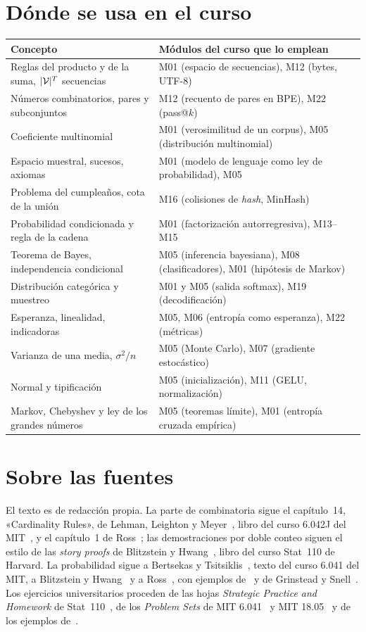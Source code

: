 \documentclass[11pt,a4paper,twoside,openany]{book}
\begin{document}
\section*{Dónde se usa en el curso}
\begin{center}\small
\begin{tabular}{@{}p{}p{}@{}}
\toprule
Concepto & Módulos del curso que lo emplean \\
\midrule
Reglas del producto y de la suma, $\lvert\mathcal{V}\rvert^{T}$ secuencias & M01 (espacio de secuencias), M12 (bytes, UTF-8) \\
Números combinatorios, pares y subconjuntos & M12 (recuento de pares en BPE), M22 (pass@$k$) \\
Coeficiente multinomial & M01 (verosimilitud de un corpus), M05 (distribución multinomial) \\
Espacio muestral, sucesos, axiomas & M01 (modelo de lenguaje como ley de probabilidad), M05 \\
Problema del cumpleaños, cota de la unión & M16 (colisiones de \emph{hash}, MinHash) \\
Probabilidad condicionada y regla de la cadena & M01 (factorización autorregresiva), M13--M15 \\
Teorema de Bayes, independencia condicional & M05 (inferencia bayesiana), M08 (clasificadores), M01 (hipótesis de Markov) \\
Distribución categórica y muestreo & M01 y M05 (salida softmax), M19 (decodificación) \\
Esperanza, linealidad, indicadoras & M05, M06 (entropía como esperanza), M22 (métricas) \\
Varianza de una media, $\sigma^{2}/n$ & M05 (Monte Carlo), M07 (gradiente estocástico) \\
Normal y tipificación & M05 (inicialización), M11 (GELU, normalización) \\
Markov, Chebyshev y ley de los grandes números & M05 (teoremas límite), M01 (entropía cruzada empírica) \\
\bottomrule
\end{tabular}
\end{center}

\section*{Sobre las fuentes}
El texto es de redacción propia. La parte de combinatoria sigue el capítulo~14, «Cardinality Rules», de Lehman, Leighton y Meyer~\cite{mcs}, libro del curso 6.042J del MIT~\cite{mit6042}, y el capítulo~1 de Ross~\cite{ross}; las demostraciones por doble conteo siguen el estilo de las \emph{story proofs} de Blitzstein y Hwang~\cite{bh}, libro del curso Stat~110 de Harvard. La probabilidad sigue a Bertsekas y Tsitsiklis~\cite{bt}, texto del curso 6.041 del MIT, a Blitzstein y Hwang~\cite{bh} y a Ross~\cite{ross}, con ejemplos de~\cite{mcs} y de Grinstead y Snell~\cite{gs}. Los ejercicios universitarios proceden de las hojas \emph{Strategic Practice and Homework} de Stat~110~\cite{stat110}, de los \emph{Problem Sets} de MIT 6.041~\cite{mit6041f10} y MIT 18.05~\cite{mit1805} y de los ejemplos de~\cite{mcs}.
\end{document}
